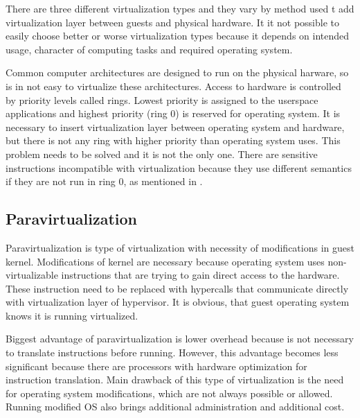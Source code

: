 
There are three different virtualization types and they vary by method used t
add virtualization layer between guests and physical hardware. It it not possible to easily choose better or worse virtualization types because it depends on intended usage, character of computing tasks and required operating system.
 
Common computer architectures are designed to run on the physical harware, so is in not easy to virtualize these architectures. Access to hardware is controlled by priority levels called rings. Lowest priority is assigned to the userspace applications and highest priority (ring 0) is reserved for operating system. It is necessary to insert virtualization layer between operating system and hardware, but there is not any ring with higher priority than operating system uses. This problem needs to be solved and it is not the only one. There are sensitive instructions incompatible with virtualization because they use different semantics if they are not run in ring 0, as mentioned in \cite{vmware-para}.

\subsection{Paravirtualization}
Paravirtualization is type of virtualization with necessity of modifications in guest kernel. Modifications of kernel are necessary because operating system uses non-virtualizable instructions that are trying to gain direct access to the hardware. These instruction need to be replaced with hypercalls that communicate directly with virtualization layer of hypervisor. \cite{vmware-para} It is obvious, that guest operating system knows it is running virtualized. 

Biggest advantage of paravirtualization is lower overhead because is not necessary to translate instructions before running. However, this advantage becomes less significant because there are processors with hardware optimization for instruction translation. Main drawback of this type of virtualization is the need for operating system modifications, which are not always possible or allowed. Running modified \Ac{OS} also brings additional administration and additional cost.

